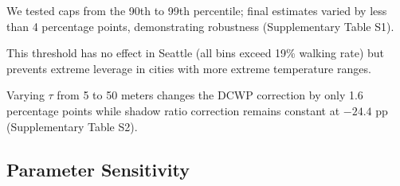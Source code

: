 


We tested caps from the 90th to 99th percentile; final estimates varied by less than 4 percentage points, demonstrating robustness (Supplementary Table S1).



This threshold has no effect in Seattle (all bins exceed 19\% walking rate) but prevents extreme leverage in cities with more extreme temperature ranges.



Varying $\tau$ from 5 to 50 meters changes the DCWP correction by only 1.6 percentage points while shadow ratio correction remains constant at $-24.4$ pp (Supplementary Table S2).




\subsection{Parameter Sensitivity}


